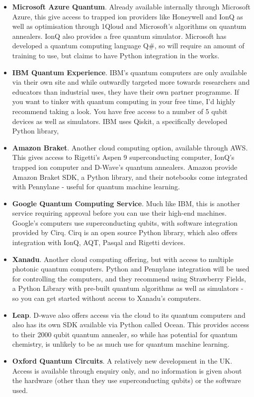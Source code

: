 \documentclass{article}
\theoremstyle{definition}
\begin{document}
\begin{itemize}
    \item \textbf{Microsoft Azure Quantum}. Already available internally through Microsoft Azure, this give access to trapped ion providers like Honeywell and IonQ as well as optimisation through 1Qloud and Microsoft's algorithms on quantum annealers. IonQ also provides a free quantum simulator. Microsoft has developed a quantum computing language Q\#, so will require an amount of training to use, but claims to have Python integration in the works. 
    \item \textbf{IBM Quantum Experience}. IBM's quantum computers are only available via their own site and while outwardly targeted more towards researchers and educators than industrial uses, they have their own partner programme. If you want to tinker with quantum computing in your free time, I'd highly recommend taking a look. You have free access to a number of 5 qubit devices as well as simulators. IBM uses Qiskit, a specifically developed Python library,
    \item \textbf{Amazon Braket}. Another cloud computing option, available through AWS. This gives access to Rigetti's Aspen 9 superconducting computer, IonQ's trapped ion computer and D-Wave's quantum annealers. Amazon provide Amazon Braket SDK, a Python library, and their notebooks come integrated with Pennylane - useful for quantum machine learning. 
    \item \textbf{Google Quantum Computing Service}. Much like IBM, this is another service requiring approval before you can use their high-end machines. Google's computers use superconducting qubits, with software integration provided by Cirq. Cirq is an open source Python library, which also offers integration with IonQ, AQT, Pasqal and Rigetti devices. 
    \item \textbf{Xanadu}. Another cloud computing offering, but with access to multiple photonic quantum computers. Python and Pennylane integration will be used for controlling the computers, and they recommend using Strawberry Fields, a Python Library with pre-built quantum algorithms as well as simulators - so you can get started without access to Xanadu's computers.  
    \item \textbf{Leap}. D-wave also offers access via the cloud to its quantum computers and also has its own SDK available via Python called Ocean. This provides access to their 2000 qubit quantum annealer, so while has potential for quantum chemistry, is unlikely to be as much use for quantum machine learning.
    \item \textbf{Oxford Quantum Circuits}. A relatively new development in the UK. Access is available through enquiry only, and no information is given about the hardware (other than they use superconducting qubits) or the software used. 
\end{itemize}
\end{document}

